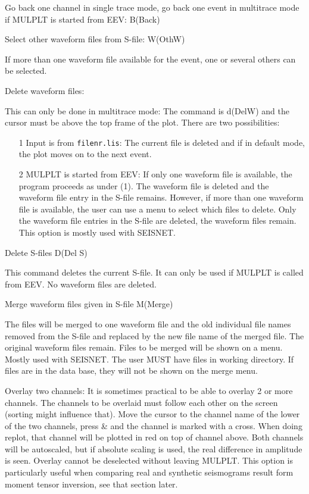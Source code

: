 Go back one channel in single trace mode, go back one event in multitrace mode if MULPLT is started from EEV: B(Back) 

Select other waveform files from S-file: W(OthW) 

If more than one waveform file available for the event, one or several others  can be selected. 

Delete waveform files: 

This can only be done in multitrace mode: The command is d(DelW) and the cursor must be above the top frame of the plot. There are two possibilities: 
\begin{itemize}
\item[1]
Input is from \texttt{filenr.lis}: The current file is deleted and if in default mode, the plot moves on to the next event. 

\item[2]
 MULPLT is started from EEV: If only one waveform file is available, the program proceeds as under (1). The waveform file is deleted and the waveform file entry in the S-file remains. However, if more than one waveform file is available, the user can use a menu to select which files to delete. Only the waveform file entries in the S-file are deleted, the waveform files remain. This option is mostly used with SEISNET. 
\end{itemize}

Delete S-files D(Del S) 

This command deletes the current S-file. It can only be used if MULPLT is called from EEV. No waveform files are deleted. 

Merge waveform files given in S-file M(Merge) 

The files will be merged to one waveform file and the old individual file names removed from the S-file and replaced by the new file name of the merged file. The original waveform files remain. Files to be merged will be shown on a menu. Mostly used with SEISNET. The user MUST have files in working directory. If files are in the data base, they will not be shown on the merge menu. 

Overlay two channels: It is sometimes practical to be able to overlay 2 or more 
channels. The channels to be overlaid must follow each other on the screen (sorting might influence that). Move the cursor to the channel name of the lower of the two channels, press \& and the channel is marked with a cross. When doing replot, that channel will be plotted in red on top of channel above. Both channels will be autoscaled, but if absolute scaling is used, the real difference in amplitude is seen. Overlay cannot be deselected without leaving MULPLT. This option is particularly useful when comparing real and synthetic seismograms result form moment tensor inversion, see that section later. 


